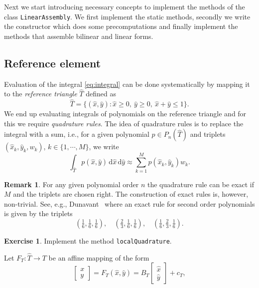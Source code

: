 \documentclass{amsart}
\theoremstyle{definition}
\newtheorem{remark}{Remark}
\newtheorem{exercise}{\color{red}Exercise}
\begin{document}
Next we start introducing necessary concepts to implement the methods
of the class \verb|LinearAssembly|. We first implement the static
methods, secondly we write the constructor which does some
precomputations and finally implement the methods that assemble
bilinear and linear forms.

\subsection{Reference element}

Evaluation of the integral \eqref{eq:integral} can be done
systematically by mapping it to the \emph{reference triangle}
$\widehat{T}$ defined as
\begin{equation}
  \widehat{T} = \{ (\widehat{x}, \widehat{y}) : \widehat{x} \geq 0,~ \widehat{y} \geq 0,~ \widehat{x}+\widehat{y}\leq 1 \}.
\end{equation}
We end up evaluating integrals of polynomials on the reference
triangle and for this we require \emph{quadrature rules}. The idea of
quadrature rules is to replace the integral with a sum, i.e., for
a given polynomial $p \in P_n(\widehat{T})$
and triplets $(\widehat{x}_k,\widehat{y}_k,w_k)$, $k \in \{1, \cdots, M\}$,
we write
\begin{equation}
  \int_{\widehat{T}} p(\widehat{x},\widehat{y}) \,\mathrm{d}\widehat{x}\,\mathrm{d}\widehat{y} \approx \sum_{k = 1}^{M} p(\widehat{x}_k,\widehat{y}_k) w_k.
\end{equation}
\begin{remark}
  For any given polynomial order $n$ the quadrature rule can be exact
  if $M$ and the triplets are chosen right. The construction of exact
  rules is, however, non-trivial. See, e.g., Dunavant~\cite{D85} where
  an exact rule for second order polynomials is given by the triplets
  \begin{equation}
    (\tfrac{1}{6},\tfrac{1}{6},\tfrac{1}{6}), \quad 
    (\tfrac{2}{3},\tfrac{1}{6},\tfrac{1}{6}), \quad 
    (\tfrac{1}{6},\tfrac{2}{3},\tfrac{1}{6}).
  \end{equation}
\end{remark}
\begin{exercise}
  Implement the method \verb|localQuadrature|.
\end{exercise}
Let $F_T : \widehat{T} \rightarrow T$ be an affine mapping of the form
\begin{equation}
  \begin{bmatrix} x \\ y \end{bmatrix} = F_T(\widehat{x},\widehat{y}) = B_T\begin{bmatrix} \widehat{x} \\ \widehat{y}\end{bmatrix}+c_T, 
\end{equation}
\end{document}
